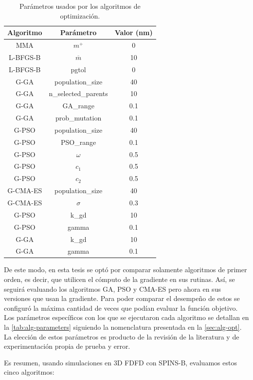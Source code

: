 \begin{table}[ht]
    \centering
    \begin{tabular}{|c|c|c|}
    \hline 
    Algoritmo & Parámetro &  Valor (nm) \\
    \hline
    MMA & $m^{+}$ & 0\\
    L-BFGS-B & $\overline{m}$ & 10 \\
    L-BFGS-B & pgtol & 0 \\
    G-GA & population\_size & 40 \\
    G-GA & n\_selected\_parents & 10 \\
    G-GA & GA\_range & 0.1 \\
    G-GA & prob\_mutation & 0.1 \\
    G-PSO & population\_size & 40 \\
    G-PSO & PSO\_range & 0.1 \\
    G-PSO & $\omega$ & 0.5 \\
    G-PSO & $c_1$ & 0.5 \\
    G-PSO & $c_2$ & 0.5 \\
    G-CMA-ES & population\_size & 40 \\
    G-CMA-ES & $\sigma$ & 0.3 \\
    G-PSO & k\_gd & 10 \\
    G-PSO & gamma & 0.1\\
    G-GA & k\_gd & 10 \\
    G-GA & gamma & 0.1\\
    \hline 
    \end{tabular}
    \caption{Parámetros usados por los algoritmos de optimización.}
    \label{tab:alg-parameters}
\end{table}

De este modo, en esta tesis se optó por comparar solamente algoritmos de primer orden, es decir, que utilicen
el cómputo de la gradiente en sus rutinas. Así, se seguirá evaluando los algoritmos GA, PSO y CMA-ES pero
ahora en sus versiones que usan la gradiente.
Para poder comparar el desempeño de estos se configuró la máxima cantidad de veces que podían
evaluar la función objetivo. 
Los parámetros específicos con los que se ejecutaron cada algoritmo se detallan en la
\autoref{tab:alg-parameters} siguiendo la nomenclatura presentada en la \autoref{sec:alg-opt}.
La elección de estos parámetros es producto de la revisión de la literatura y de experimentación
propia de prueba y error.

Es resumen, usando simulaciones en 3D FDFD con SPINS-B, evaluamos estos cinco algoritmos:

